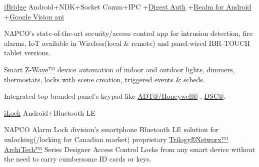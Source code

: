 

\begin{projectentries}

  \projectentry 
    {\href{http://www.napcosecurity.com/products/ibridge/}{iBridge}}
    {Android+NDK+Socket Comm+IPC
    +{\href{https://searchsecurity.techtarget.com/definition/digest-authentication}{Digest Auth}}
    +{\href{https://realm.io/docs/java/0.82.2/}{Realm for Android}}
    +{\href{https://developers.google.com/vision/android/barcodes-overview}{Google Vision api}} }
    {
      \begin{projectitems} %
        \item {NAPCO's state-of-the-art security/access control app for intrusion detection, fire alarms, IoT 
        available in Wireless(local \& remote) and panel-wired IBR-TOUCH tablet versions.}
        \item {Smart 
        {\href{https://www.z-wave.com/shop-z-wave-smart-home-products/smart-hubs-napco-napco-i-bridge-z-wave-controller}{Z-Wave™}}
         device automation of indoor and outdoor lights, dimmers, thermostats, locks with scene creation, triggered events \& scheds.}
        \item {Integrated top branded panel's keypad like 
        {\href{https://www.security.honeywell.com/product-repository/6160v}{ADT®/Honeywell®}}
        , {\href{http://www.dsc.com/index.php?n=products&o=view&id=60}{DSC®}}.}
      \end{projectitems}
    }
    
    \projectentry 
    {\href{https://play.google.com/store/apps/details?id=com.napcosecurity.android.ilock&hl=en}{iLock}}
    {Android+Bluetooth LE}
    {
      \begin{projectitems} %
        \item {NAPCO Alarm Lock division's smartphone Bluetooth LE solution for unlocking(/locking for Canadian market) proprietary 
        {\href{http://www.alarmlock.com}{Trilogy®Networx™ ArchiTech™}} 
        Series Designer Access Control Locks from any smart device without the need to carry cumbersome ID cards or keys.}
      \end{projectitems}
    }


\end{projectentries}

